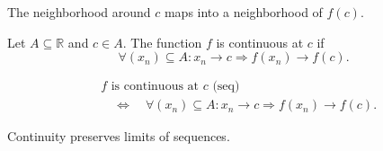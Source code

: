 \begin{remark*}[Interpretation]
The neighborhood around $c$ maps into a neighborhood of $f(c)$.
\end{remark*}


\begin{definition}
\label{def:continuous-at-point-seq}
Let $A \subseteq \mathbb{R}$ and $c \in A$. The function $f$ is
continuous at $c$ if
\[
\forall (x_n) \subseteq A :
x_n \to c \Rightarrow f(x_n) \to f(c).
\]
\end{definition}

\begin{remark*}
\[
\begin{aligned}
&f \text{ is continuous at } c \text{ (seq)} \\
&\quad\Longleftrightarrow\quad
\forall (x_n) \subseteq A :
x_n \to c \Rightarrow f(x_n) \to f(c).
\end{aligned}
\]
\end{remark*}

\begin{remark*}[Interpretation]
Continuity preserves limits of sequences.
\end{remark*}